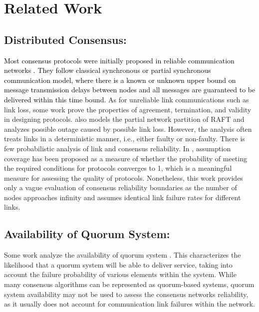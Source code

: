\section{Related Work}
\label{sec: related work}

\subsection{Distributed Consensus:}
\textcolor{black}{Most consensus protocols were initially proposed in reliable communication networks \cite{10.1145/357172.357176,doi:10.1137/0212045,feldman1997optimal,10.1145/42282.42283,184040,lamport2001paxos,castro1999practical,yin2019hotstuff}. They follow classical synchronous or partial synchronous communication model, where there is a known or unknown upper bound on message transmission delays between nodes and all messages are guaranteed to be delivered within this time bound.} As for unreliable link communications such as link loss, some work \cite{doi:10.1137/S009753970443999X, 6312888,1238089} prove the properties of agreement, termination, and validity in designing protocols. \cite{10.1145/3447851.3458739} also models the partial network partition of RAFT and analyzes possible outage caused by possible link loss. However, the analysis often treats links in a deterministic manner, i.e., either faulty or non-faulty. There is few probabilistic analysis of link and consensus reliability. 
In \cite{doi:10.1137/S009753970443999X}, assumption coverage has been proposed as a measure of whether the probability of meeting the required conditions for protocols converges to 1, which is a meaningful measure for assessing the quality of protocols. Nonetheless, this work provides only a vague evaluation of consensus reliability boundaries as the number of nodes approaches infinity and assumes identical link failure rates for different links. 

\subsection{Availability of Quorum System: } Some work analyze the availability of quorum system \cite{Peleg1995TheAO, doi:10.1137/S0097539797325235}. This characterizes the likelihood that a quorum system will be able to deliver service, taking into account the failure probability of various elements within the system. While many consensus algorithms can be represented as quorum-based systems, quorum system availability may not be used to assess the consensus networks reliability, as it usually does not account for communication link failures within the network.



